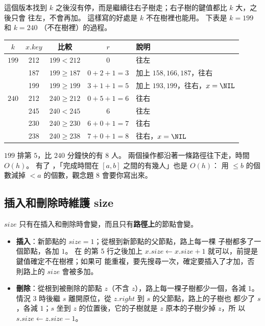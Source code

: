這個版本找到 $k$ 之後沒有停，而是繼續往右子樹走；右子樹的鍵值都比 $k$ 大，之後只會
往左，不會再加。 這樣寫的好處是 $k$ 不在樹裡也能用。 下表是 $k = 199$ 和 $k = 240$
（不在樹裡）的過程。

\begin{center}
\begin{tabular}{ccccl}
\toprule
$k$ & $x.\mathit{key}$ & 比較 & $r$ & 說明 \\
\midrule
$199$ & 212 & $199 < 212$ & 0 & 往左 \\
      & 187 & $199 \ge 187$ & $0 + 2 + 1 = 3$ & 加上 $158, 166, 187$，往右 \\
      & 199 & $199 \ge 199$ & $3 + 1 + 1 = 5$ & 加上 $193, 199$，往右，$x = \NIL$ \\
\midrule
$240$ & 212 & $240 \ge 212$ & $0 + 5 + 1 = 6$ & 往右 \\
      & 245 & $240 < 245$ & 6 & 往左 \\
      & 230 & $240 \ge 230$ & $6 + 0 + 1 = 7$ & 往右 \\
      & 238 & $240 \ge 238$ & $7 + 0 + 1 = 8$ & 往右，$x = \NIL$ \\
\bottomrule
\end{tabular}
\end{center}

$199$ 排第 $5$，比 $240$ 分鐘快的有 $8$ 人。 兩個操作都沿著一條路徑往下走，時間
$O(h)$。 有了 ，「完成時間在 $[a, b]$ 之間的有幾人」也是 $O(h)$：
用 $\le b$ 的個數減掉 $< a$ 的個數，觀念題 8 會要你寫出來。

\subsection{插入和刪除時維護 size}

$\mathit{size}$ 只有在插入和刪除時會變，而且只有\textbf{路徑上}的節點會變。

\begin{itemize}
\item \textbf{插入}：新節點的 $\mathit{size} = 1$；從根到新節點的父節點，路上每一棵
子樹都多了一個節點，各加 $1$。 在  的第 5 行之後加上
$x.\mathit{size} \gets x.\mathit{size} + 1$ 就可以，前提是鍵值確定不在樹裡；如果可
能重複，要先搜尋一次，確定要插入了才加，否則路上的 $\mathit{size}$ 會被多加。
\item \textbf{刪除}：從根到被刪除的節點 $z$（不含 $z$），路上每一棵子樹都少一個，各減
$1$。 情況 3 時後繼 $s$ 離開原位，從 $z.\mathit{right}$ 到 $s$ 的父節點，路上的子樹也
都少了 $s$，各減 $1$；$s$ 坐到 $z$ 的位置後，它的子樹就是 $z$ 原本的子樹少掉 $z$，所
以 $s.\mathit{size} \gets z.\mathit{size} - 1$。
\end{itemize}

